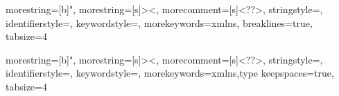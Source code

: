 



{
  morestring=[b]",
  morestring=[s]{>}{<},
  morecomment=[s]{<?}{?>},
  stringstyle=\color{black},
  identifierstyle=\color{darkblue},
  keywordstyle=\color{cyan},
  morekeywords={xmlns}, %
  breaklines=true,
  tabsize=4
}

{
  morestring=[b]",
  morestring=[s]{>}{<},
  morecomment=[s]{<?}{?>},
  stringstyle=\color{black},
  identifierstyle=\color{darkblue},
  keywordstyle=\color{cyan},
  morekeywords={xmlns,type}
  keepspaces=true,
  tabsize=4
}

